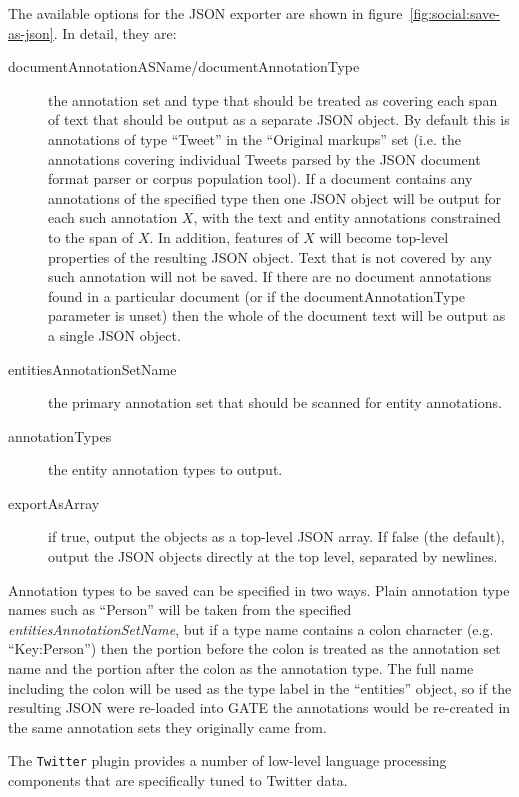 The available options for the JSON exporter are shown in
figure~\ref{fig:social:save-as-json}.  In detail, they are:
\begin{description}
\item[documentAnnotationASName/documentAnnotationType] the annotation set and
  type that should be treated as covering each span of text that should be output
  as a separate JSON object.  By default this is annotations of type ``Tweet'' in
  the ``Original markups'' set (i.e. the annotations covering individual Tweets
  parsed by the JSON document format parser or corpus population tool).  If a
  document contains any annotations of the specified type then one JSON object
  will be output for each such annotation $X$, with the text and entity
  annotations constrained to the span of $X$.  In addition, features of $X$
  will become top-level properties of the resulting JSON object.  Text that is
  not covered by any such annotation will not be saved.  If there are no
  document annotations found in a particular document (or if the
  documentAnnotationType parameter is unset) then the whole of the document
  text will be output as a single JSON object.
\item[entitiesAnnotationSetName] the primary annotation set that should be
  scanned for entity annotations.
\item[annotationTypes] the entity annotation types to output.
\item[exportAsArray] if true, output the objects as a top-level JSON array.  If
  false (the default), output the JSON objects directly at the top level,
  separated by newlines.
\end{description}

Annotation types to be saved can be specified in two ways.  Plain annotation
type names such as ``Person'' will be taken from the specified
\emph{entitiesAnnotationSetName}, but if a type name contains a colon character
(e.g. ``Key:Person'') then the portion before the colon is treated as the
annotation set name and the portion after the colon as the annotation type.
The full name including the colon will be used as the type label in the
``entities'' object, so if the resulting JSON were re-loaded into GATE the
annotations would be re-created in the same annotation sets they originally
came from.


The \verb!Twitter! plugin provides a number of low-level language processing
components that are specifically tuned to Twitter data.

